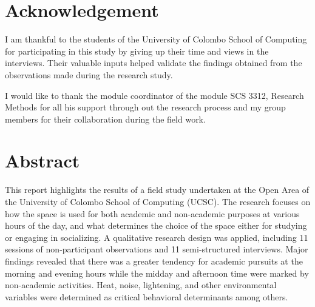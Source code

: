 \documentclass[12pt]{report}
\begin{document}
\chapter*{Acknowledgement}

I am thankful to the students of the University of Colombo School of Computing for participating in this study by giving up their time and views in the interviews. Their valuable inputs helped validate 
the findings obtained from the observations made during the research study.

I would like to thank the module coordinator of the module SCS 3312, Research Methods for all his support through out the research process and my group members for their collaboration during the field work.
\newpage

\tableofcontents
\newpage



\chapter*{Abstract}

This report highlights the results of a field study undertaken at the Open Area of the University of Colombo School of Computing (UCSC). The research focuses on how the space is used for both academic and non-academic purposes at various hours of the day, and what determines the choice of the space either for studying or engaging in socializing. A qualitative research design was applied, including 11 sessions of non-participant observations and 11 semi-structured interviews. Major findings revealed that there was a greater tendency 
for academic pursuits at the morning and evening hours while the midday and afternoon time were marked by non-academic activities. Heat, noise, lightening, and other environmental variables were determined as critical behavioral determinants among others.
\end{document}
